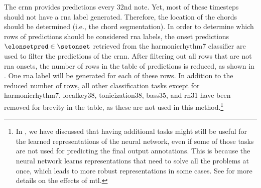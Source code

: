
The \gls{crnn} provides predictions every \gls{32nd} note.
Yet, most of these timesteps should not have a \gls{rna}
label generated. Therefore, the location of the chords
should be determined (i.e., the chord segmentation). In
order to determine which rows of predictions should be
considered \gls{rna} labels, the onset predictions
$\elonsetpred \in \setonset$ retrieved from the
\gls{harmonicrhythm7} classifier are used to filter the
predictions of the \gls{crnn}. After filtering out all rows
that are not \gls{rna} onsets, the number of rows in the
table of predictions is reduced, as shown in
. One \gls{rna} label
will be generated for each of these rows. In addition to the
reduced number of rows, all other classification tasks
except for \gls{harmonicrhythm7}, \gls{localkey38},
\gls{tonicization38}, \gls{bass35}, and \gls{rn31} have been
removed for brevity in the table, as these are not used in
this method.\footnote{In
\textcite{napoleslopez2021augmentednet}, we have discussed
that having additional tasks might still be useful for the
learned representations of the neural network, even if some
of those tasks are not used for predicting the final output
annotations. This is because the neural network learns
representations that need to solve all the problems at once,
which leads to more robust representations in some cases.
See \textcite{ruder2017overview} for more details on the
effects of \gls{mtl}.}

